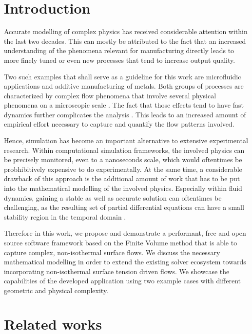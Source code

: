 \documentclass[conference,final,a4paper]{IEEEtran}
\begin{document}
\section{Introduction}

Accurate modelling of complex physics has received considerable attention within the last two decades.
This can mostly be attributed to the fact that an increased understanding of the phenomena relevant for manufacturing directly leads to more finely tuned or even new processes that tend to increase output quality.

Two such examples that shall serve as a guideline for this work are microfluidic applications and additive manufacturing of metals.
Both groups of processes are characterized by complex flow phenomena that involve several physical phenomena on a microscopic scale \cite{sackmannPresentFutureRole,debroyAdditiveManufacturingMetallic2018}. The fact that those effects tend to have fast dynamics further complicates the analysis \cite{khairallahControllingInterdependentMesonanosecond2020}. This leads to an increased amount of empirical effort necessary to capture and quantify the flow patterns involved.

Hence, simulation has become an important alternative to extensive experimental research. Within computational simulation frameworks, the involved physics can be precisely monitored, even to a nanoseconds scale, which would oftentimes be probhibitively expensive to do experimentally. At the same time, a considerable drawback of this approach is the additional amount of work that has to be put into the mathematical modelling of the involved physics. Especially within fluid dynamics, gaining a stable as well as accurate solution can oftentimes be challenging, as the resulting set of partial differential equations can have a small stability region in the temporal domain \cite{laxStabilityDifferenceSchemes2013}.

Therefore in this work, we propose and demonstrate a performant, free and open source software framework based on the Finite Volume method that is able to capture complex, non-isothermal surface flows. We discuss the necessary mathematical modelling in order to extend the existing solver ecosystem towards incorporating non-isothermal surface tension driven flows. We showcase the capabilities of the developed application using two example cases with different geometric and physical complexity.

\section{Related works}
\end{document}
